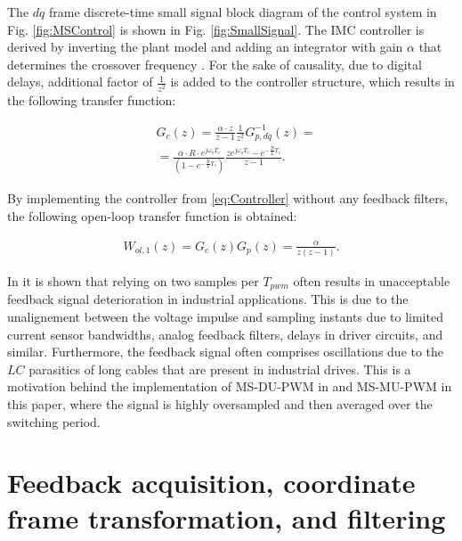 \documentclass[conference]{IEEEtran}
\begin{document}
The $dq$ frame discrete-time small signal block diagram of the control system in Fig. \ref{fig:MSControl} is shown in Fig. \ref{fig:SmallSignal}. The IMC controller is derived by inverting the plant model and adding an integrator with gain $\alpha$ that determines the crossover frequency \cite{vuksa2016}. For the sake of causality, due to digital delays, additional factor of $\frac{1}{z^2}$ is added to the controller structure, which results in the following transfer function:

\begin{equation}
\begin{aligned}
& G_{c}(z) =  \frac{\alpha \cdot z}{z-1} \frac{1}{z^2} G^{-1}_{p,dq}(z)  = \\
& =  \frac{\alpha \cdot R \cdot e^{j\omega_o T_c}}{\left( 1 - e^{-\frac{R}{L}T_c}\right)}\frac{z e^{j\omega_o T_c}-e^{-\frac{R}{L}T_c}}{z-1}.
\label{eq:Controller} 
\end{aligned}    
\end{equation}

By implementing the controller from \eqref{eq:Controller} without any feedback filters, the following open-loop transfer function is obtained:

\begin{equation}
\begin{aligned}
W_{ol,1}(z) = G_c(z) G_p(z) =  \frac{\alpha}{z(z-1)}.
\label{eq:OpenLoop} 
\end{aligned}    
\end{equation}

In \cite{vuksa2016} it is shown that relying on two samples per $T_{pwm}$ often results in unacceptable feedback signal deterioration in industrial applications. This is due to the unalignement between the voltage impulse and sampling instants due to limited current sensor bandwidths, analog feedback filters, delays in driver circuits, and similar. Furthermore, the feedback signal often comprises oscillations due to the $LC$ parasitics of long cables that are present in industrial drives. This is a motivation behind the implementation of MS-DU-PWM in \cite{vuksa2016} and MS-MU-PWM in this paper, where the signal is highly oversampled and then averaged over the switching period.

\section{Feedback acquisition, coordinate frame transformation, and filtering}
\end{document}
